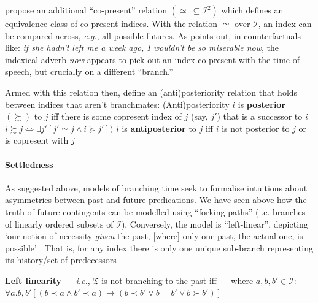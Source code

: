 \documentclass[12pt,dvipsnames]{report}
\begin{document}
\cite{Thomason1980} propose an additional ``co-present'' relation $( \boldsymbol\simeq\ \subseteq\mathcal I^2) $ which defines an equivalence class of co-present indices. With the relation $ \simeq $ over $ \mathcal I $, an index can be compared across, \textit{e.g.}, all possible futures. As \citet[101]{Landman1991} points out, in counterfactuals like: \textit{if she hadn't left me a week ago, I wouldn't be so miserable now}, the indexical adverb \textit{now} appears to pick out an index co-present with the time of speech, but crucially on a different ``branch.'' %


Armed with this relation then, \citeauthor{Thomason1980} define an (anti)posteriority relation that holds between indices that aren't branchmates:
\pex (Anti)posteriority \citep[311]{Thomason1980}
\a $ i $ is \textbf{posterior} $ (\boldsymbol\succsim )$ to $ j $ iff there is some copresent index of $ j $ (say, $ j' $) that is a successor to $ i $ \hfill
$i \boldsymbol\succsim j\Leftrightarrow\exists j'[j'\simeq j\wedge i\succcurlyeq j'] )$
\a $ i $ is \textbf{antiposterior} to $ j $ iff $ i $ is not posterior to $ j $ or is copresent with $ j $ \\
\xe

\paragraph{Settledness} As suggested above, models of branching time seek to formalise intuitions about asymmetries between past and future predications. We have seen above how the truth of future contingents can be modelled using ``forking paths'' (i.e. branches of linearly ordered subsets of $ \mathcal I $). Conversely, the model is ``left-linear'', depicting `our notion of necessity \textit{given} the past, [where] only one past, the actual one, is possible' \citep[159]{Burgess1978}. That is, for any index there is only one unique sub-branch representing its history/set of predecessors

\ex {} \textbf{Left linearity }--- \textit{i.e.}, $ \mathfrak T $ is not branching to the past iff --- where $ a,b,b'\in\mathcal I: $\\
$ \forall a.b,b'[(b\prec a\wedge b'\prec a)\to(b\prec b'\vee b=b'\vee b\succ b')] $\xe
\end{document}
